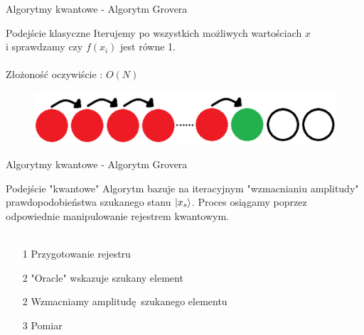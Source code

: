 \documentclass{beamer}
\DeclarePairedDelimiter\ket{\lvert}{\rangle}
\begin{document}
		\begin{frame}{Algorytmy kwantowe - Algorytm Grovera}
		\begin{block}{Podejście klasyczne}
			\vspace{0.5em}
			Iterujemy po wszystkich możliwych wartościach $x$ \\i sprawdzamy czy $f(x_{i})$ jest równe 1.\\~\\
			Złożoność oczywiście : $O(N)$
			\vspace{0.5em}
		\end{block}
		\vspace{0.5em}
		\begin{center}
			\begin{figure}
				\includegraphics[scale=0.25]{media/classicSearch.png}
			\end{figure}
		\end{center}
	\end{frame}

	\begin{frame}{Algorytmy kwantowe - Algorytm Grovera}
		\begin{block}{Podejście "kwantowe"}
			\vspace{0.5em}
			Algorytm bazuje na iteracyjnym "wzmacnianiu amplitudy" prawdopodobieństwa szukanego stanu $\ket{x_s}$.
			Proces osiągamy poprzez odpowiednie manipulowanie rejestrem kwantowym.\\~\\
			
			\begin{enumerate}
				
				\item[1] Przygotowanie rejestru
				\item[2] "Oracle" wskazuje szukany element
				\item[2] Wzmacniamy amplitudę szukanego elementu
				\item[3] Pomiar
								
			\end{enumerate}
			\vspace{0.5em}
		\end{block}
	\end{frame}
\end{document}
